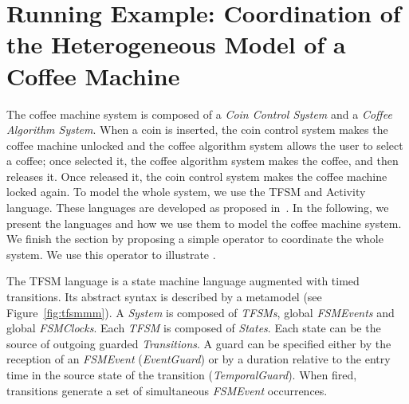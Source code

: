\section{Running Example: Coordination of the Heterogeneous Model of a Coffee Machine}
\label{sec:runningexample}
The coffee machine system is composed of a \emph{Coin Control System} and a \emph{Coffee Algorithm System}. When a coin is inserted, the coin control system makes the coffee machine unlocked and the coffee algorithm system allows the user to select a coffee; once selected it, the coffee algorithm system makes the coffee, and then releases it. Once released it, the coin control system makes the coffee machine locked again. To model the whole system, we use the TFSM and Activity language. These languages are developed as proposed in~\cite{sle13-combemale}. In the following, we present the languages and how we use them to model the coffee machine system. We finish the section by proposing a simple \bcool operator to coordinate the whole system. We use this operator to illustrate \bcool.   



The TFSM language is a state machine language augmented with timed transitions. Its abstract syntax is described by a metamodel (see Figure~\ref{fig:tfsmmm}). A \emph{System} is composed of \emph{TFSMs}, global \emph{FSMEvents} and global \emph{FSMClocks}. Each \emph{TFSM} is composed of \emph{States}. Each state can be the source of outgoing guarded \emph{Transitions}. A guard can be specified either by the reception of an \emph{FSMEvent} (\emph{EventGuard}) or by a duration relative to the entry time in the source state of the transition (\emph{TemporalGuard}). When fired, transitions generate a set of simultaneous \emph{FSMEvent} occurrences.
	
